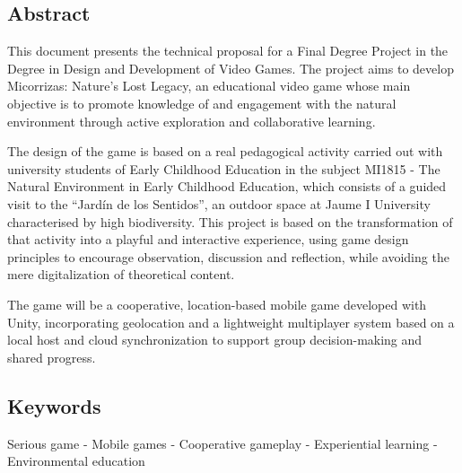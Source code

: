 \subsection[Abstract]{\centering Abstract}
This document presents the technical proposal for a Final Degree Project in the Degree in Design and Development of Video Games. The project aims to develop Micorrizas: Nature's Lost Legacy, an educational video game whose main objective is to promote knowledge of and engagement with the natural environment through active exploration and collaborative learning.

The design of the game is based on a real pedagogical activity carried out with university students of Early Childhood Education in the subject MI1815 - The Natural Environment in Early Childhood Education, which consists of a guided visit to the “Jardín de los Sentidos”, an outdoor space at Jaume I University characterised by high biodiversity. This project is based on the transformation of that activity into a playful and interactive experience, using game design principles to encourage observation, discussion and reflection, while avoiding the mere digitalization of theoretical content.

The game will be a cooperative, location-based mobile game developed with Unity, incorporating geolocation and a lightweight multiplayer system based on a local host and cloud synchronization to support group decision-making and shared progress.


\subsection{Keywords}
Serious game - Mobile games - Cooperative gameplay - Experiential learning - Environmental education

\newpage

